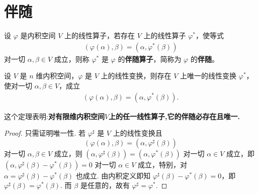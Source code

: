 \documentclass[../../main.tex]{subfiles}%
\begin{document}
\section{伴随}

\begin{definition}[伴随]
设 $\varphi$ 是内积空间 $V$ 上的线性算子，若存在 $V$ 上的线性算子 $\varphi^*$，使等式
\begin{align*}
(\varphi(\alpha),\beta) = (\alpha,\varphi^*(\beta))
\end{align*}
对一切 $\alpha,\beta \in V$ 成立，则称 $\varphi^*$ 是 $\varphi$ 的\textbf{伴随算子}，简称为 $\varphi$ 的\textbf{伴随}。
\end{definition}

\begin{theorem}\label{theorem:有限维空间伴随必存在且唯一}
设 $V$ 是 $n$ 维内积空间，$\varphi$ 是 $V$ 上的线性变换，则存在 $V$ 上唯一的线性变换 $\varphi^*$，使对一切 $\alpha,\beta \in V$，成立
\begin{align*}
(\varphi(\alpha),\beta) = (\alpha,\varphi^*(\beta)).
\end{align*}
\end{theorem}
\begin{note}
这个定理表明:\textbf{对有限维内积空间$V$上的任一线性算子,它的伴随必存在且唯一.}
\end{note}
\begin{proof}

只需证明唯一性. 若 $\varphi^{\sharp}$ 是 $V$ 上的线性变换且
\[
(\varphi(\alpha),\beta) = (\alpha,\varphi^{\sharp}(\beta))
\]
对一切 $\alpha,\beta \in V$ 成立，则 $(\alpha,\varphi^{\sharp}(\beta)) = (\alpha,\varphi^*(\beta))$ 对一切 $\alpha \in V$ 成立，即 $(\alpha,\varphi^{\sharp}(\beta) - \varphi^*(\beta)) = 0$ 对一切 $\alpha \in V$ 成立，特别，对 $\alpha = \varphi^{\sharp}(\beta) - \varphi^*(\beta)$ 也成立. 由内积定义即知 $\varphi^{\sharp}(\beta) - \varphi^*(\beta) = 0$，即 $\varphi^{\sharp}(\beta) = \varphi^*(\beta)$. 而 $\beta$ 是任意的，故有 $\varphi^{\sharp} = \varphi^*$.

\end{proof}
\end{document}
